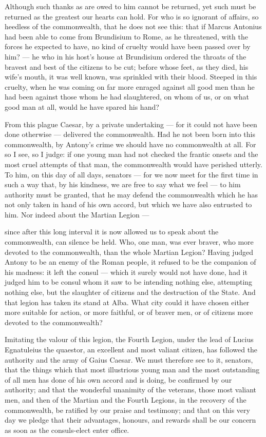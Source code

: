  Although such thanks as are owed to him cannot be returned, yet such must be returned as the greatest our hearts can hold. For who is so ignorant of affairs, so heedless of the commonwealth, that he does not see this: that if Marcus Antonius had been able to come from Brundisium to Rome, as he threatened, with the forces he expected to have, no kind of cruelty would have been passed over by him? --- he who in his host's house at Brundisium ordered the throats of the bravest and best of the citizens to be cut; before whose feet, as they died, his wife's mouth, it was well known, was sprinkled with their blood. Steeped in this cruelty, when he was coming on far more enraged against all good men than he had been against those whom he had slaughtered, on whom of us, or on what good man at all, would he have spared his hand?

 From this plague Caesar, by a private undertaking --- for it could not have been done otherwise --- delivered the commonwealth. Had he not been born into this commonwealth, by Antony's crime we should have no commonwealth at all. For so I see, so I judge: if one young man had not checked the frantic onsets and the most cruel attempts of that man, the commonwealth would have perished utterly. To him, on this day of all days, senators --- for we now meet for the first time in such a way that, by his kindness, we are free to say what we feel --- to him authority must be granted, that he may defend the commonwealth which he has not only taken in hand of his own accord, but which we have also entrusted to him. Nor indeed about the Martian Legion ---

 since after this long interval it is now allowed us to speak about the commonwealth, can silence be held. Who, one man, was ever braver, who more devoted to the commonwealth, than the whole Martian Legion? Having judged Antony to be an enemy of the Roman people, it refused to be the companion of his madness: it left the consul --- which it surely would not have done, had it judged him to be consul whom it saw to be intending nothing else, attempting nothing else, but the slaughter of citizens and the destruction of the State. And that legion has taken its stand at Alba. What city could it have chosen either more suitable for action, or more faithful, or of braver men, or of citizens more devoted to the commonwealth?

 Imitating the valour of this legion, the Fourth Legion, under the lead of Lucius Egnatuleius the quaestor, an excellent and most valiant citizen, has followed the authority and the army of Gaius Caesar. We must therefore see to it, senators, that the things which that most illustrious young man and the most outstanding of all men has done of his own accord and is doing, be confirmed by our authority; and that the wonderful unanimity of the veterans, those most valiant men, and then of the Martian and the Fourth Legions, in the recovery of the commonwealth, be ratified by our praise and testimony; and that on this very day we pledge that their advantages, honours, and rewards shall be our concern as soon as the consuls-elect enter office.

